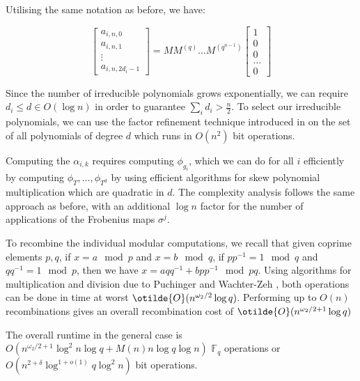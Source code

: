 \documentclass{acmart}
\theoremstyle{remark}
\numberwithin{equation}{section}
\begin{document}
Utilising the same notation as before, we have:

\[ \begin{bmatrix} a_{i,n,0} \\ a_{i,n,1} \\ \vdots \\ a_{i,n,2d_i -1} \end{bmatrix} = MM^{(q)} \ldots M^{(q^{n-1})} \begin{bmatrix}1 \\ 0 \\ 0 \\ \ldots \\ 0 \end{bmatrix}\]

Since the number of irreducible polynomials grows exponentially, we can require $d_i \leq d \in O(\log n)$ in order to guarantee $\sum_{i} d_i > \frac{n}{2}$. To select our irreducible polynomials, we can use the factor refinement technique introduced in \cite{Bach:1993:FR:158390.158392} on the set of all polynomials of degree $d$ which runs in $O(n^2)$ bit operations.

Computing the $\alpha_{i,k}$ requires computing $\phi_{g_i}$, which we can do for all $i$ efficiently by computing $\phi_T, \ldots, \phi_{T^d}$ by using efficient algorithms for skew polynomial multiplication which are quadratic in $d$. The complexity analysis follows the same approach as before, with an additional $\log n$ factor for the number of applications of the Frobenius maps $\sigma^j$. 

To recombine the individual modular computations, we recall that given coprime elements $p,q$, if $x = a \mod p$ and $x = b \mod q$, if $pp^{-1} = 1 \mod q$ and $qq^{-1} = 1 \mod p$, then we have $x = aqq^{-1} + bpp^{-1} \mod pq$. Using algorithms for multiplication and division due to Puchinger and Wachter-Zeh \cite{PUCHINGER2017}, both operations can be done in time at worst $\otilde{O}(n^{\omega_2/2} \log q)$. Performing up to $O(n)$ recombinations gives an overall recombination cost of $\otilde{O}(n^{\omega_2/2 + 1} \log q)$

The overall runtime in the general case is $O(n^{\omega_2/2 + 1} \log^2 n \log q + M(n) n \log q \log n)$ $\mathbb{F}_q$ operations  or $O(n^{2+\delta} \log^{1 + o(1)} q \log^2 n)$ bit operations.  



\end{document}
